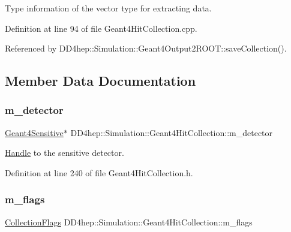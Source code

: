 Type information of the vector type for extracting data. 



Definition at line 94 of file Geant4\+Hit\+Collection.\+cpp.



Referenced by D\+D4hep\+::\+Simulation\+::\+Geant4\+Output2\+R\+O\+O\+T\+::save\+Collection().



\subsection{Member Data Documentation}
\hypertarget{class_d_d4hep_1_1_simulation_1_1_geant4_hit_collection_aaf3c4ccd370663a99af26333af3486e7}{}\label{class_d_d4hep_1_1_simulation_1_1_geant4_hit_collection_aaf3c4ccd370663a99af26333af3486e7} 
\subsubsection{\texorpdfstring{m\+\_\+detector}{m\_detector}}
{\footnotesize\ttfamily \hyperlink{class_d_d4hep_1_1_simulation_1_1_geant4_sensitive}{Geant4\+Sensitive}$\ast$ D\+D4hep\+::\+Simulation\+::\+Geant4\+Hit\+Collection\+::m\+\_\+detector\hspace{0.3cm}{\ttfamily [protected]}}



\hyperlink{class_d_d4hep_1_1_handle}{Handle} to the sensitive detector. 



Definition at line 240 of file Geant4\+Hit\+Collection.\+h.

\hypertarget{class_d_d4hep_1_1_simulation_1_1_geant4_hit_collection_a9c557501c37d783cbc1be1443aef03a9}{}\label{class_d_d4hep_1_1_simulation_1_1_geant4_hit_collection_a9c557501c37d783cbc1be1443aef03a9} 
\subsubsection{\texorpdfstring{m\+\_\+flags}{m\_flags}}
{\footnotesize\ttfamily \hyperlink{union_d_d4hep_1_1_simulation_1_1_geant4_hit_collection_1_1_collection_flags}{Collection\+Flags} D\+D4hep\+::\+Simulation\+::\+Geant4\+Hit\+Collection\+::m\+\_\+flags\hspace{0.3cm}{\ttfamily [protected]}}



